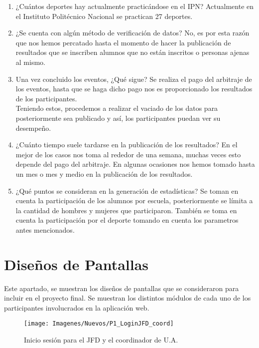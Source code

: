 \begin{enumerate}
		\item ¿Cuántos deportes hay actualmente practicándose en el IPN?
		Actualmente en el Instituto Politécnico Nacional se practican 27 deportes.
		
		\item ¿Se cuenta con algún método de verificación de datos?
		No, es por esta razón que nos hemos percatado hasta el momento de hacer la publicación de resultados que se inscriben alumnos que no están inscritos o personas ajenas al mismo.
		
		\item Una vez concluido los eventos, ¿Qué sigue?
		Se realiza el pago del arbitraje de los eventos, hasta que se haga dicho pago nos es proporcionado los resultados de los participantes.\\
		Teniendo estos, procedemos a realizar el vaciado de los datos para posteriormente sea publicado y así, los participantes puedan ver su desempeño.
		
		\item ¿Cuánto tiempo suele tardarse en la publicación de los resultados?
		En el mejor de los casos nos toma al rededor de una semana, muchas veces esto depende del pago del arbitraje. En algunas ocasiones nos hemos tomado hasta un mes o mes y medio en la publicación de los resultados. 
		
		\item ¿Qué puntos se consideran en la generación de estadísticas?
		Se toman en cuenta la participación de los alumnos por escuela, posteriormente se límita a la cantidad de hombres y mujeres que participaron. También se toma en cuenta la participación por el deporte tomando en cuenta los parametros antes mencionados.
		
	\end{enumerate} 
		
	\chapter{Diseños de Pantallas}
	\label{diseños}
	\noindent Este apartado, se muestran los diseños de pantallas que se consideraron para incluir en el proyecto final. Se muestran los distintos módulos de cada uno de los participantes involucrados en la aplicación web.
	
		\begin{figure}[hbt!]
			\centering
			\texttt{[image: Imagenes/Nuevos/P1\_LoginJFD\_coord]}
			\caption{Inicio sesión para el JFD y el coordinador de U.A.}
			\label{inicioJFDycoord}
		\end{figure}
		\pagebreak
		
